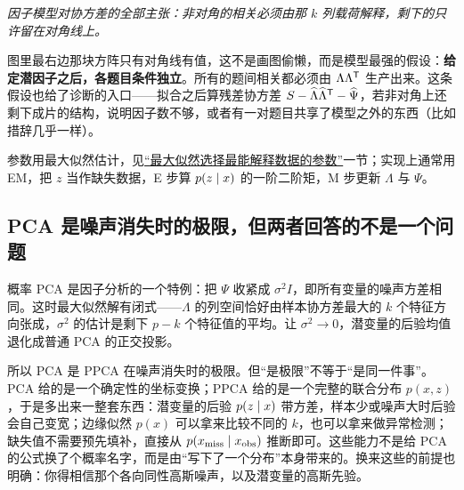 \begin{center}
\end{center}

\emph{因子模型对协方差的全部主张：非对角的相关必须由那 \(k\) 列载荷解释，剩下的只许留在对角线上。}

图里最右边那块方阵只有对角线有值，这不是画图偷懒，而是模型最强的假设：\textbf{给定潜因子之后，各题目条件独立}。所有的题间相关都必须由 \(\Lambda\Lambda^{\mathsf{T}}\) 生产出来。这条假设也给了诊断的入口——拟合之后算残差协方差 \(S-\widehat\Lambda\widehat\Lambda^{\mathsf{T}}-\widehat\Psi\)，若非对角上还剩下成片的结构，说明因子数不够，或者有一对题目共享了模型之外的东西（比如措辞几乎一样）。

参数用最大似然估计，见\hyperref[sec:11-Mathematical-Statistics/02-Point-Estimation/03]{``最大似然选择最能解释数据的参数''}一节；实现上通常用 EM，把 \(z\) 当作缺失数据，E 步算 \(p(z\mid x)\) 的一阶二阶矩，M 步更新 \(\Lambda\) 与 \(\Psi\)。

\subsection{PCA 是噪声消失时的极限，但两者回答的不是一个问题}

概率 PCA 是因子分析的一个特例：把 \(\Psi\) 收紧成 \(\sigma^2 I\)，即所有变量的噪声方差相同。这时最大似然解有闭式——\(\Lambda\) 的列空间恰好由样本协方差最大的 \(k\) 个特征方向张成，\(\sigma^2\) 的估计是剩下 \(p-k\) 个特征值的平均。让 \(\sigma^2\to 0\)，潜变量的后验均值退化成普通 PCA 的正交投影。

所以 PCA 是 PPCA 在噪声消失时的极限。但``是极限''不等于``是同一件事''。PCA 给的是一个确定性的坐标变换；PPCA 给的是一个完整的联合分布 \(p(x,z)\)，于是多出来一整套东西：潜变量的后验 \(p(z\mid x)\) 带方差，样本少或噪声大时后验会自己变宽；边缘似然 \(p(x)\) 可以拿来比较不同的 \(k\)，也可以拿来做异常检测；缺失值不需要预先填补，直接从 \(p(x_{\text{miss}}\mid x_{\text{obs}})\) 推断即可。这些能力不是给 PCA 的公式换了个概率名字，而是由``写下了一个分布''本身带来的。换来这些的前提也明确：你得相信那个各向同性高斯噪声，以及潜变量的高斯先验。


